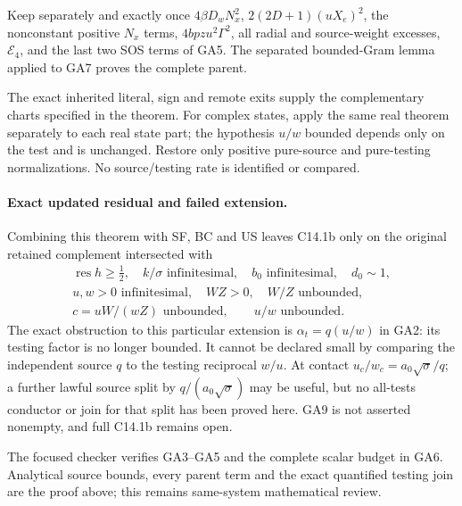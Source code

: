 Keep separately and exactly once $4\beta D_wN_x^2$,
$2(2D+1)(uX_e)^2$, the nonconstant positive $N_x$ terms,
$4bpzu^2\Gamma^2$, all radial and source-weight excesses,
$\mathcal E_4$, and the last two SOS terms of GA5. The separated
bounded-Gram lemma applied to GA7 proves the complete parent.

The exact inherited literal, sign and remote exits supply the
complementary charts specified in the theorem. For complex states,
apply the same real theorem separately to each real state part;
the hypothesis $u/w$ bounded depends only on the test and is
unchanged. Restore only positive pure-source and pure-testing
normalizations. No source/testing rate is identified or compared.

\paragraph{Exact updated residual and failed extension.}
Combining this theorem with SF, BC and US leaves C14.1b only on
the original retained complement intersected with
\[
\begin{gathered}
 \operatorname{res}h\ge\tfrac12,\quad k/\sigma\text{ infinitesimal},
 \quad b_0\text{ infinitesimal},\quad d_0\sim1,\\
 u,w>0\text{ infinitesimal},\quad WZ>0,\quad W/Z\text{ unbounded},\\
 c=uW/(wZ)\text{ unbounded},\qquad u/w\text{ unbounded}.
\end{gathered}\tag{GA9}
\]
The exact obstruction to this particular extension is
$\alpha_t=q(u/w)$ in GA2: its testing factor is no longer bounded.
It cannot be declared small by comparing the independent source
$q$ to the testing reciprocal $w/u$. At contact
$u_c/w_c=a_0\sqrt\sigma/q$; a further lawful source split by
$q/(a_0\sqrt\sigma)$ may be useful, but no all-tests conductor or
join for that split has been proved here. GA9 is not asserted
nonempty, and full C14.1b remains open.

The focused checker verifies GA3--GA5 and the complete scalar
budget in GA6. Analytical source bounds, every parent term and the
exact quantified testing join are the proof above; this remains
same-system mathematical review.
